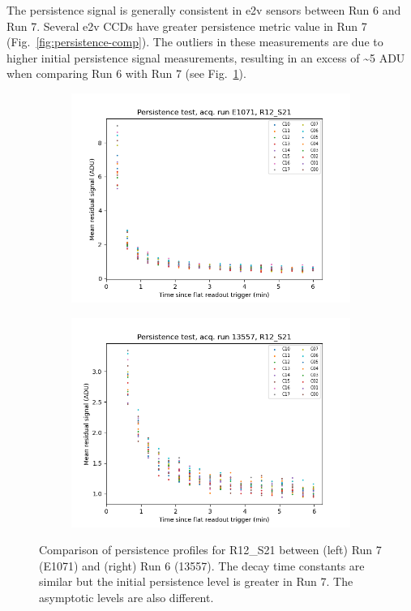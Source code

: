 The persistence signal is generally consistent in e2v sensors between Run 6 and Run 7. Several
e2v CCDs have greater persistence metric value in Run 7 (Fig.~\ref{fig:persistence-comp}). The outliers in
these measurements are due to higher initial persistence signal
measurements, resulting in an excess of \textasciitilde5 ADU when
comparing Run 6 with Run 7 (see Fig.~\ref{fig:persistence-decay-comp}).


\begin{figure}
\centering
\begin{subfigure}{0.5\textwidth}
  \centering
  \includegraphics[width=1.0\textwidth]{figures/baselineCharacterization/persistence_plot_LSSTCam_R12_S21_u_lsstccs_eo_persistence_E1071_w_2024_35_20240925T180602Z.png}
\end{subfigure}%
\begin{subfigure}{0.5\textwidth}
  \centering
  \includegraphics[width=1\textwidth]{figures/baselineCharacterization/persistence_plot_LSSTCam_R12_S21_u_lsstccs_eo_persistence_13557_w_2023_41_20231118T050437Z.png}
\end{subfigure}
\caption{Comparison of persistence profiles for R12\_S21 between (left) Run 7 (E1071) and (right) Run 6 (13557).  The decay time constants are similar but the initial persistence level is greater in Run 7.  The asymptotic levels are also different.}
\label{fig:persistence-decay-comp}
\end{figure}

